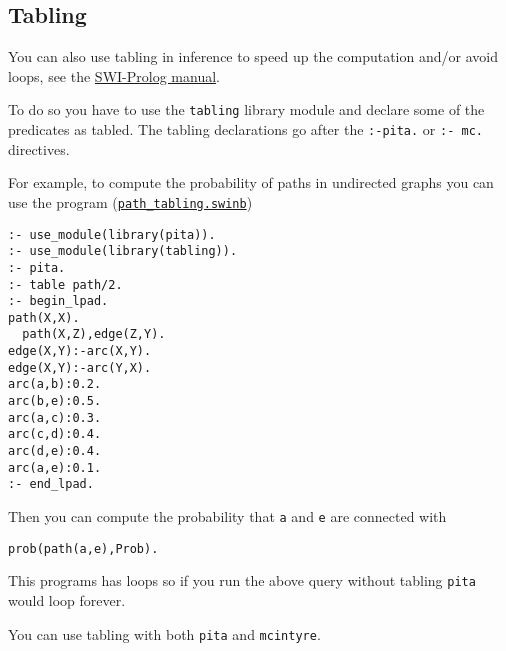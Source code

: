 \subsection{Tabling}
You can also use tabling in inference to speed up the computation and/or avoid loops, see
the \href{http://www.swi-prolog.org/pldoc/man?section=tabling}{SWI-Prolog manual}.

To do so you have to use the \verb|tabling| library module and declare some of the predicates
as tabled. The tabling declarations go after the \verb|:-pita.| or \verb|:- mc.| directives.

For example, to compute the probability of paths in undirected graphs you can use
the program (\href{http://cplint.lamping.unife.it/example/inference/path_tabling.swinb}{\texttt{path\_tabling.swinb}})
\begin{verbatim}
:- use_module(library(pita)).
:- use_module(library(tabling)).
:- pita.
:- table path/2.
:- begin_lpad.
path(X,X).
  path(X,Z),edge(Z,Y).
edge(X,Y):-arc(X,Y).
edge(X,Y):-arc(Y,X).
arc(a,b):0.2.
arc(b,e):0.5.
arc(a,c):0.3.
arc(c,d):0.4.
arc(d,e):0.4.
arc(a,e):0.1.
:- end_lpad.
\end{verbatim}
Then you can compute the probability that \verb|a| and \verb|e| are connected with
\begin{verbatim}
prob(path(a,e),Prob).
\end{verbatim}
This programs has loops so if you run the above query without tabling \verb|pita| would loop forever.

You can use tabling with both \verb|pita| and \verb|mcintyre|.

